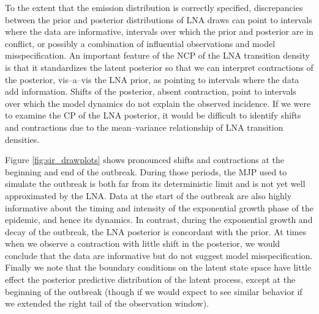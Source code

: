 To the extent that the emission distribution is correctly specified, discrepancies between the prior and posterior distributions of LNA draws can point to intervals where the data are informative, intervals over which the prior and posterior are in conflict, or possibly a combination of influential observations and model misspecification. An important feature of the NCP of the LNA transition density is that it standardizes the latent posterior so that we can interpret contractions of the posterior, vis--a--vis the LNA prior, as pointing to intervals where the data add information. Shifts of the posterior, absent contraction, point to intervals over which the model dynamics do not explain the observed incidence. If we were to examine the CP of the LNA posterior, it would be difficult to identify shifts and contractions due to the mean--variance relationship of LNA transition densities.

Figure \ref{fig:sir_drawplots} shows pronounced shifts and contractions at the beginning and end of the outbreak. During those periods, the MJP used to simulate the outbreak is both far from its deterministic limit and is not yet well approximated by the LNA. Data at the start of the outbreak are also highly informative about the timing and intensity of the exponential growth phase of the epidemic, and hence its dynamics. In contrast, during the exponential growth and decay of the outbreak, the LNA posterior is concordant with the prior. At times when we observe a contraction with little shift in the posterior, we would conclude that the data are informative but do not suggest model misspecification. Finally we note that the boundary conditions on the latent state space have little effect the posterior predictive distribution of the latent process, except at the beginning of the outbreak (though if we would expect to see similar behavior if we extended the right tail of the observation window). 


